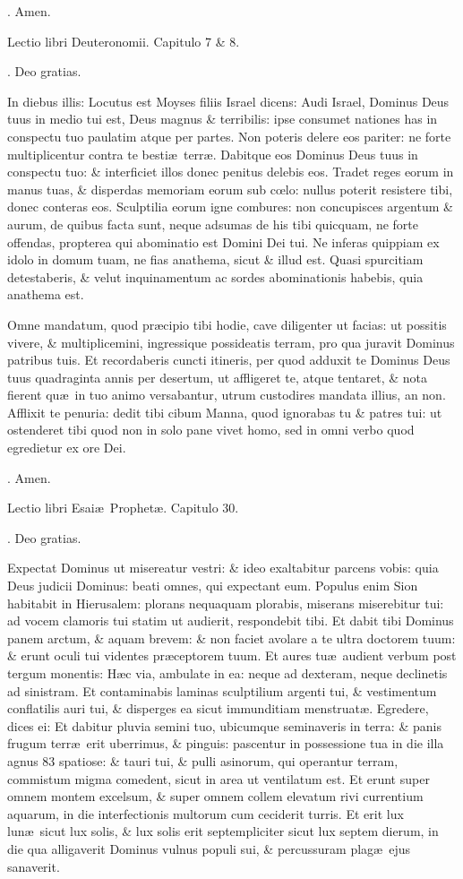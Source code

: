 \documentclass[letter,11pt]{book}
\makeatletter
\DeclareRobustCommand{\Rbar}{\vers@resp{0pt}{R}}
\newcommand{\vers@resp@sym}{\raisebox{0.2ex}{\rotatebox[origin=c]{-20}{$\m@th\rceil$}}}
\newcommand{\vers@resp}[2]{%
  {\ooalign{\hidewidth\kern#1\vers@resp@sym\hidewidth\cr#2\cr}}%
}%
\def\R{\color{Red} \Rbar . \color{black}}
\makeatother
\begin{document}
\begin{multicols*}{2}
\R Amen.

Lectio libri Deuteronomii. Capitulo 7 \& 8.

\R Deo gratias.

In diebus illis: Locutus est Moyses filiis Israel dicens: Audi Israel, Dominus Deus tuus in medio tui est, Deus magnus \& terribilis: ipse consumet nationes has in conspectu tuo paulatim atque per partes. Non poteris delere eos pariter: ne forte multiplicentur contra te besti\ae \ terr\ae . Dabitque eos Dominus Deus tuus in conspectu tuo: \& interficiet illos donec penitus delebis eos. Tradet reges eorum in manus tuas, \& disperdas memoriam eorum sub c\oe lo: nullus poterit resistere tibi, donec conteras eos. Sculptilia eorum igne combures: non concupisces argentum \& aurum, de quibus facta sunt, neque adsumas de his tibi quicquam, ne forte offendas, propterea qui abominatio est Domini Dei tui. Ne inferas quippiam ex idolo in domum tuam, ne fias anathema, sicut \& illud est. Quasi spurcitiam detestaberis, \& velut inquinamentum ac sordes abominationis habebis, quia anathema est.

Omne mandatum, quod pr\ae cipio tibi hodie, cave diligenter ut facias: ut possitis vivere, \& multiplicemini, ingressique possideatis terram, pro qua juravit Dominus patribus tuis. Et recordaberis cuncti itineris, per quod adduxit te Dominus Deus tuus quadraginta annis per desertum, ut affligeret te, atque tentaret, \& nota fierent qu\ae \ in tuo animo versabantur, utrum custodires mandata illius, an non. Afflixit te penuria: dedit tibi cibum Manna, quod ignorabas tu \& patres tui: ut ostenderet tibi quod non in solo pane vivet homo, sed in omni verbo quod egredietur ex ore Dei.

\R Amen.

Lectio libri Esai\ae \ Prophet\ae . Capitulo 30.

\R Deo gratias.

Expectat Dominus ut misereatur vestri: \& ideo exaltabitur parcens vobis: quia Deus judicii Dominus: beati omnes, qui expectant eum. Populus enim Sion habitabit in Hierusalem: plorans nequaquam plorabis, miserans miserebitur tui: ad vocem clamoris tui statim ut audierit, respondebit tibi. Et dabit tibi Dominus panem arctum, \& aquam brevem: \& non faciet avolare a te ultra doctorem tuum: \& erunt oculi tui videntes pr\ae ceptorem tuum. Et aures tu\ae \ audient verbum post tergum monentis: H\ae c via, ambulate in ea: neque ad dexteram, neque declinetis ad sinistram. Et contaminabis laminas sculptilium argenti tui, \& vestimentum conflatilis auri tui, \& disperges ea sicut immunditiam menstruat\ae . Egredere, dices ei: Et dabitur pluvia semini tuo, ubicumque seminaveris in terra: \& panis frugum terr\ae \ erit uberrimus, \& pinguis: pascentur in possessione tua in die illa agnus 83 spatiose: \& tauri tui, \& pulli asinorum, qui operantur terram, commistum migma comedent, sicut in area ut ventilatum est. Et erunt super omnem montem excelsum, \& super omnem collem elevatum rivi currentium aquarum, in die interfectionis multorum cum ceciderit turris. Et erit lux lun\ae \ sicut lux solis, \& lux solis erit septempliciter sicut lux septem dierum, in die qua alligaverit Dominus vulnus populi sui, \& percussuram plag\ae \ ejus sanaverit.


\end{multicols*}
\end{document}
